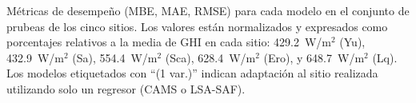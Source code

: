 \documentclass[letterpaper,12pt, twoside]{report}
\providecommand{\DIFdeltex}[1]{{\protect\color{red} \scriptsize #1}} %
\providecommand{\DIFdelFL}[1]{\DIFdel{#1}} %
\providecommand{\DIFdel}[1]{\texorpdfstring{\DIFdeltex{#1}}{}} %
\begin{document}
{%
\DIFdelFL{Métricas de desempeño (MBE, MAE, RMSE) para cada modelo en el conjunto de prubeas de los cinco sitios. Los valores están normalizados y expresados como porcentajes relativos a la media de GHI en cada sitio: 429.2~W/m$^2$ (Yu), 432.9~W/m$^2$ (Sa), 554.4~W/m$^2$ (Sca), 628.4~W/m$^2$ (Ero), y 648.7~W/m$^2$ (Lq). Los modelos etiquetados con ``(1 var.)'' indican adaptación al sitio realizada utilizando solo un regresor (CAMS o LSA-SAF).}}

\end{document}
